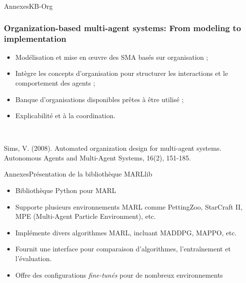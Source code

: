 \begin{frame}{Annexes}{KB-Org}
    \frametitle{Organization-based multi-agent systems: From modeling to implementation}
    
    \begin{itemize}
        \item Modélisation et mise en œuvre des SMA basés sur organisation ;
        \item Intègre les concepts d'organisation pour structurer les interactions et le comportement des agents ;
        \item Banque d'organisations disponibles prêtes à être utilisé ;
        \item Explicabilité et à la coordination.
    \end{itemize}
    
    \

    Sims, V. (2008). Automated organization design for multi-agent systems. Autonomous Agents and Multi-Agent Systems, 16(2), 151-185.

\end{frame}

\begin{frame}{Annexes}{Présentation de la bibliothèque MARLlib}

    \begin{itemize}
        \item Bibliothèque Python pour MARL
        \item Supporte plusieurs environnements MARL comme PettingZoo, StarCraft II, MPE (Multi-Agent Particle Environment), etc.
        \item Implémente divers algorithmes MARL, incluant MADDPG, MAPPO, etc.
        \item Fournit une interface pour comparaison d’algorithmes, l’entraînement et l’évaluation.
        \item Offre des configurations \textit{fine-tunés} pour de nombreux environnements
    \end{itemize}

\end{frame}

